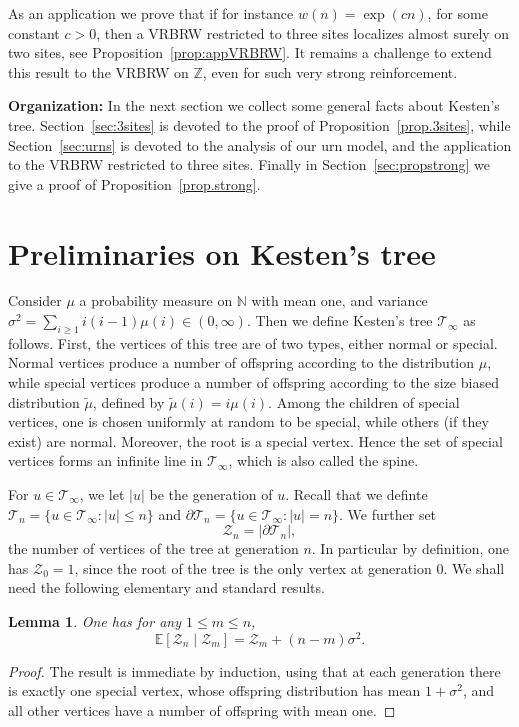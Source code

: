 \documentclass[11pt]{article}
\newtheorem {lem} {Lemma} [section]
\newcommand{\1}{{\text{\Large $\mathfrak 1$}}}
\begin{document}
As an application we prove that if for instance $w(n) = \exp(cn)$, for some constant $c>0$, then a VRBRW restricted to three sites localizes almost surely on two sites, see Proposition~\ref{prop:appVRBRW}. 
It remains a challenge to extend this result to the VRBRW on $\mathbb Z$, even for such very strong reinforcement. 

\vspace{0.2cm}
\textbf{Organization:} In the next section we collect some general facts about Kesten's tree. Section~\ref{sec:3sites} is devoted to the proof of Proposition~\ref{prop.3sites}, while Section~\ref{sec:urns} is devoted to the analysis of our urn model, and the application to the VRBRW restricted to three sites. 
Finally in Section~\ref{sec:propstrong} we give a proof of Proposition~\ref{prop.strong}. 


\section{Preliminaries on Kesten's tree}\label{sec.Kesten}
Consider $\mu$ a probability measure on $\mathbb N$ with mean one, and variance $\sigma^2= \sum_{i\ge 1} i(i-1)\mu(i)\in (0,\infty)$. Then we define Kesten's tree $\mathcal T_\infty$ as follows. First, the vertices of this tree are of two types, either normal or special. Normal vertices produce a number of offspring according to the distribution $\mu$, while special vertices produce a number of offspring according to the size biased distribution $\widetilde \mu$, defined by $\widetilde \mu(i ) = i\mu(i)$. Among the children of special vertices, one is chosen uniformly at random to be special, while others (if they exist) are normal. Moreover, the root is a special vertex. Hence the set of special vertices forms an infinite line in $\mathcal T_\infty$, which is also called the spine. 
 

For $u\in \mathcal T_\infty$, we let $|u|$ be the generation of $u$. Recall that we definte $\mathcal T_n = \{u\in \mathcal T_\infty : |u|\le n\}$ and $\partial \mathcal T_n = \{u\in \mathcal T_\infty : |u|=  n\}$. We further set 
$$\mathcal Z_n= |\partial \mathcal T_n|,$$  
the number of vertices of the tree at generation $n$.  In particular by definition, one has $\mathcal Z_0 = 1$, since the root of the tree is the only vertex at generation $0$. We shall need the following elementary and standard results. 
\begin{lem}\label{lem:esp}
One has for any $1\le m \le n$, 
$$ \mathbb E[\mathcal Z_n\mid \mathcal Z_m] = \mathcal Z_m +  (n-m)\sigma^2. $$
\end{lem}
\begin{proof}
The result is immediate by induction, using that at each generation there is exactly one special vertex, whose offspring distribution has mean $1+\sigma^2$, and all other vertices have a number of offspring with mean one. 
\end{proof}
\end{document}
